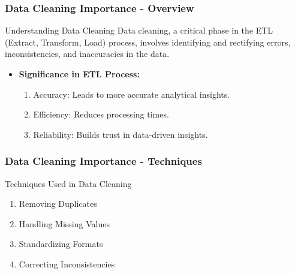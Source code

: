 \documentclass[aspectratio=169]{beamer}
\begin{document}
\begin{frame}[fragile]
    \frametitle{Data Cleaning Importance - Overview}
    \begin{block}{Understanding Data Cleaning}
        Data cleaning, a critical phase in the ETL (Extract, Transform, Load) process, involves identifying and rectifying errors, inconsistencies, and inaccuracies in the data. 
    \end{block}
    
    \begin{itemize}
        \item \textbf{Significance in ETL Process:}
            \begin{enumerate}
                \item Accuracy: Leads to more accurate analytical insights.
                \item Efficiency: Reduces processing times.
                \item Reliability: Builds trust in data-driven insights.
            \end{enumerate}
    \end{itemize}
\end{frame}

\begin{frame}[fragile]
    \frametitle{Data Cleaning Importance - Techniques}
    \begin{block}{Techniques Used in Data Cleaning}
        \begin{enumerate}
            \item Removing Duplicates
            \item Handling Missing Values
            \item Standardizing Formats
            \item Correcting Inconsistencies
        \end{enumerate}
    \end{block}
\end{frame}
\end{document}

